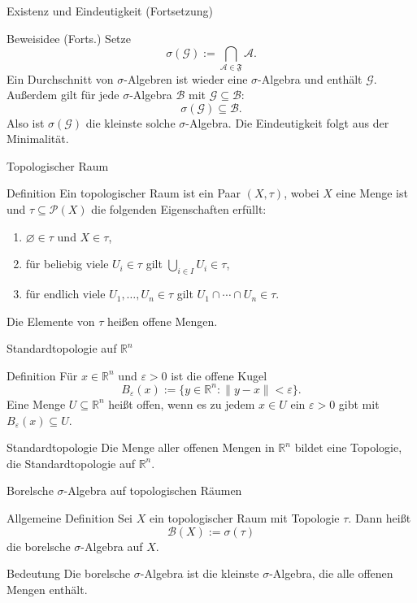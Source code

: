 \documentclass{beamer}
\begin{document}
\begin{frame}{Existenz und Eindeutigkeit (Fortsetzung)}
\begin{block}{Beweisidee (Forts.)}
Setze
\[
\sigma(\mathcal G):=\bigcap_{\mathcal A\in\mathfrak F}\mathcal A.
\]
Ein Durchschnitt von \(\sigma\)-Algebren ist wieder eine \(\sigma\)-Algebra und enthält \(\mathcal G\).
Außerdem gilt für jede \(\sigma\)-Algebra \(\mathcal B\) mit \(\mathcal G\subseteq\mathcal B\):
\[
\sigma(\mathcal G)\subseteq\mathcal B.
\]
Also ist \(\sigma(\mathcal G)\) die kleinste solche \(\sigma\)-Algebra.
Die Eindeutigkeit folgt aus der Minimalität.
\end{block}
\end{frame}

\begin{frame}{Topologischer Raum}
\begin{block}{Definition}
Ein topologischer Raum ist ein Paar \((X,\tau)\), wobei \(X\) eine Menge ist und
\(\tau\subseteq\mathcal P(X)\) die folgenden Eigenschaften erfüllt:
\begin{enumerate}
    \item \(\varnothing\in\tau\) und \(X\in\tau\),
    \item für beliebig viele \(U_i\in\tau\) gilt \(\bigcup_{i\in I} U_i\in\tau\),
    \item für endlich viele \(U_1,\dots,U_n\in\tau\) gilt \(U_1\cap\cdots\cap U_n\in\tau\).
\end{enumerate}
Die Elemente von \(\tau\) hei\ss{}en offene Mengen.
\end{block}
\end{frame}

\begin{frame}{Standardtopologie auf \(\mathbb R^n\)}
\begin{block}{Definition}
Für \(x\in\mathbb R^n\) und \(\varepsilon>0\) ist die offene Kugel
\[
B_\varepsilon(x):=\{y\in\mathbb R^n : \|y-x\|<\varepsilon\}.
\]
Eine Menge \(U\subseteq\mathbb R^n\) hei\ss{}t offen, wenn es zu jedem \(x\in U\) ein \(\varepsilon>0\) gibt mit \(B_\varepsilon(x)\subseteq U\).
\end{block}

\begin{block}{Standardtopologie}
Die Menge aller offenen Mengen in \(\mathbb R^n\) bildet eine Topologie, die Standardtopologie auf \(\mathbb R^n\).
\end{block}
\end{frame}

\begin{frame}{Borelsche \(\sigma\)-Algebra auf topologischen Räumen}
\begin{block}{Allgemeine Definition}
Sei \(X\) ein topologischer Raum mit Topologie \(\tau\).
Dann hei\ss{}t
\[
\mathcal B(X):=\sigma(\tau)
\]
die borelsche \(\sigma\)-Algebra auf \(X\).
\end{block}

\begin{block}{Bedeutung}
Die borelsche \(\sigma\)-Algebra ist die kleinste \(\sigma\)-Algebra, die alle offenen Mengen enthält.
\end{block}
\end{frame}
\end{document}
